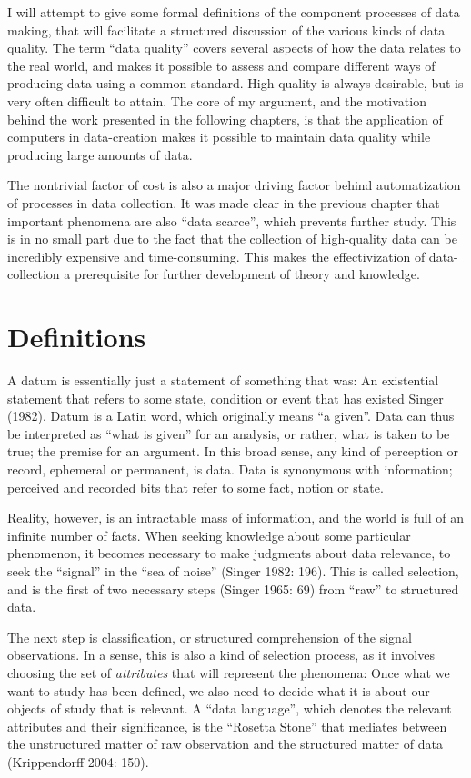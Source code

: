 \documentclass[12pt,twoside]{reedthesis}
\begin{document}
I will attempt to give some formal definitions of the component
processes of data making, that will facilitate a structured discussion
of the various kinds of data quality. The term ``data quality'' covers
several aspects of how the data relates to the real world, and makes it
possible to assess and compare different ways of producing data using a
common standard. High quality is always desirable, but is very often
difficult to attain. The core of my argument, and the motivation behind
the work presented in the following chapters, is that the application of
computers in data-creation makes it possible to maintain data quality
while producing large amounts of data.

The nontrivial factor of cost is also a major driving factor behind
automatization of processes in data collection. It was made clear in the
previous chapter that important phenomena are also ``data scarce'',
which prevents further study. This is in no small part due to the fact
that the collection of high-quality data can be incredibly expensive and
time-consuming. This makes the effectivization of data-collection a
prerequisite for further development of theory and knowledge.

\section{Definitions}\label{definitions}

A datum is essentially just a statement of something that was: An
existential statement that refers to some state, condition or event that
has existed Singer (1982). Datum is a Latin word, which originally means
``a given''. Data can thus be interpreted as ``what is given'' for an
analysis, or rather, what is taken to be true; the premise for an
argument. In this broad sense, any kind of perception or record,
ephemeral or permanent, is data. Data is synonymous with information;
perceived and recorded bits that refer to some fact, notion or state.

Reality, however, is an intractable mass of information, and the world
is full of an infinite number of facts. When seeking knowledge about
some particular phenomenon, it becomes necessary to make judgments about
data relevance, to seek the ``signal'' in the ``sea of noise'' (Singer
1982: 196). This is called selection, and is the first of two necessary
steps (Singer 1965: 69) from ``raw'' to structured data.

The next step is classification, or structured comprehension of the
signal observations. In a sense, this is also a kind of selection
process, as it involves choosing the set of \emph{attributes} that will
represent the phenomena: Once what we want to study has been defined, we
also need to decide what it is about our objects of study that is
relevant. A ``data language'', which denotes the relevant attributes and
their significance, is the ``Rosetta Stone'' that mediates between the
unstructured matter of raw observation and the structured matter of data
(Krippendorff 2004: 150).
\end{document}
